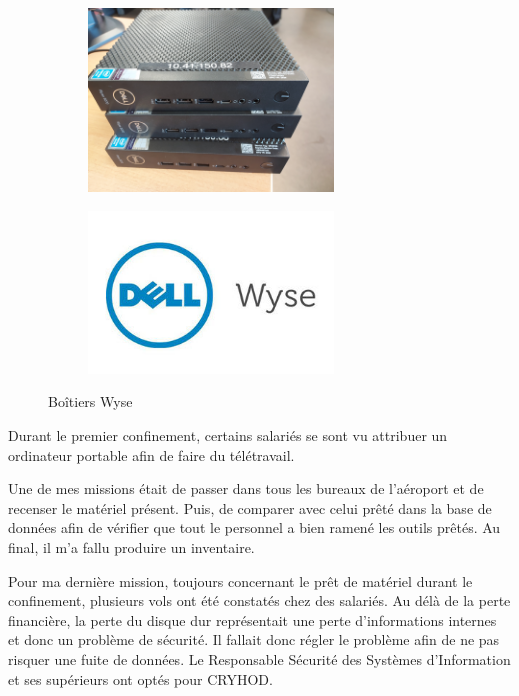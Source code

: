\begin{figure}[hbt!]
  \begin{subfigure}{0.5\textwidth}
    \centering
    \includegraphics[width=6.5cm]{Images/wyse.jpg}  
    \label{fig:wyse}
  \end{subfigure}
  \begin{subfigure}{0.5\textwidth}
    \centering
    \includegraphics[width=6.5cm]{Images/wyse_logo.jpg}  
    \label{fig:logowyse}
  \end{subfigure}
  \caption{Boîtiers Wyse}
\end{figure}

Durant le premier confinement, certains salariés se sont vu attribuer un ordinateur portable afin de faire du télétravail.

Une de mes missions était de passer dans tous les bureaux de l’aéroport et de recenser le matériel présent. Puis, de comparer avec celui prêté dans la base de données afin de vérifier que tout le personnel a bien ramené les outils prêtés.
Au final, il m'a fallu produire un inventaire.\newline


Pour ma dernière mission, toujours concernant le prêt de matériel durant le confinement, plusieurs vols ont été constatés chez des salariés. Au délà de la perte financière, la perte du disque dur représentait une perte d’informations internes et donc un problème de sécurité. Il fallait donc régler le problème afin de ne pas risquer une fuite de données. Le Responsable Sécurité des Systèmes d’Information et ses supérieurs ont optés pour CRYHOD.


